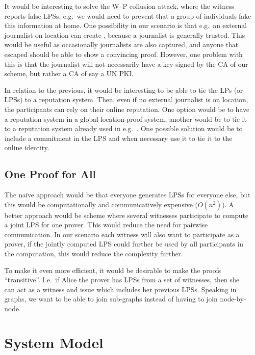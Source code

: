 It would be interesting to solve the W--P collusion attack, where the witness 
reports false \acp{LPS}, e.g.\ we would need to prevent that a group of 
individuals fake this information at home.
One possibility in our scenario is that e.g.\ an external journalist on 
location can create , because a journalist is generally trusted.
This would be useful as occasionally journalists are also captured, and anyone 
that escaped should be able to show a convincing proof.
However, one problem with this is that the journalist will not necessarily have 
a key signed by the \ac{CA} of our scheme, but rather a \ac{CA} of say a UN 
\ac{PKI}.

In relation to the previous, it would be interesting to be able to tie the 
\acp{LP} (or \acp{LPS}) to a reputation system.
Then, even if no external journalist is on location, the participants can rely 
on their online reputation.
One option would be to have a reputation system in a global location-proof 
system, another would be to tie it to a reputation system already used in e.g.\ 
.
One possible solution would be to include a commitment in the \ac{LPS} and when 
necessary use it to tie it to the online identity.

\subsection{One Proof for All}

The naïve approach would be that everyone generates \acp{LPS} for everyone 
else, but this would be computationally and communicatively expensive 
(\(O(n^2)\)).
A better approach would be  scheme where several witnesses participate 
to compute a joint \ac{LPS} for one prover.
This would reduce the need for pairwise communication.
In our scenario each witness will also want to participate as a prover, if the 
jointly computed \ac{LPS} could further be used by all participants in the 
computation, this would reduce the complexity further.

To make it even more efficient, it would be desirable to make the proofs 
\enquote{transitive}.
I.e.\ if Alice the prover has \acp{LPS} from a set of witnesses, then she can 
act as a witness and issue \iac{LPS} which includes her previous \acp{LPS}.
Speaking in graphs, we want to be able to join sub-graphs instead of having to 
join node-by-node.


\section{System Model}
\label{SystemModel}

